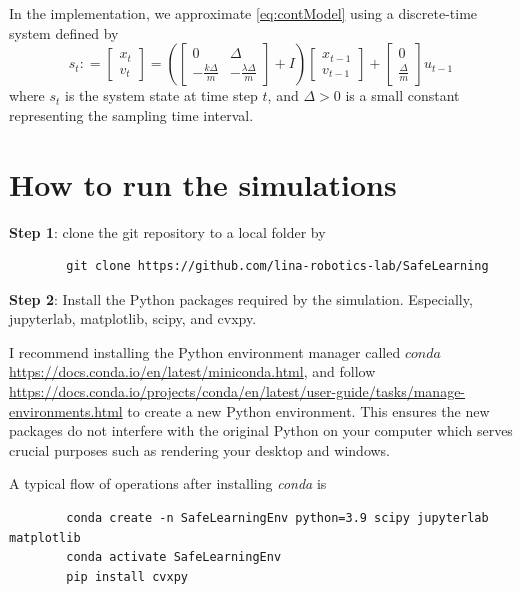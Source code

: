 \documentclass{article}
\theoremstyle{definition}
\theoremstyle{remark}
\begin{document}
	In the implementation, we approximate \eqref{eq:contModel} using a discrete-time system defined by 
	\begin{equation}\label{eq:discModel}
		s_t : = \begin{bmatrix}
			x_t\\
			v_t
		\end{bmatrix} = (\begin{bmatrix}
		0& \Delta \\
		- \frac{k \Delta}{m}  & - \frac{\lambda \Delta}{m} 
	\end{bmatrix}+I)\begin{bmatrix}
	x_{t-1}\\
	v_{t-1}
	\end{bmatrix}  + \begin{bmatrix}
	0\\
	\frac{\Delta}{m}
	\end{bmatrix}u_{t-1}
	\end{equation}
where $s_t$ is the system state at time step $t$, and $\Delta>0$ is a small constant representing the sampling time interval.

	\section{How to run the simulations}\label{sec:howto}

	\textbf{Step 1}: clone the git repository to a local folder by 
	\begin{verbatim}
		git clone https://github.com/lina-robotics-lab/SafeLearning
	\end{verbatim}

	\textbf{Step 2}: Install the Python packages required by the simulation. 
	Especially, jupyterlab, matplotlib, scipy, and cvxpy.
	
	I recommend installing the Python environment manager called $conda$ \url{https://docs.conda.io/en/latest/miniconda.html}, and follow \url{https://docs.conda.io/projects/conda/en/latest/user-guide/tasks/manage-environments.html} to create a new Python environment. This ensures the new packages do not interfere with the original Python on your computer which serves crucial purposes such as rendering your desktop and windows.
	
	A typical flow of operations after installing \textit{conda} is
	\begin{verbatim}
		conda create -n SafeLearningEnv python=3.9 scipy jupyterlab matplotlib
		conda activate SafeLearningEnv 
		pip install cvxpy
	\end{verbatim}
	
\end{document}
